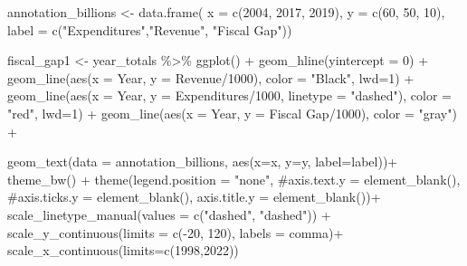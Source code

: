 \documentclass[
  letterpaper,
  DIV=11,
  numbers=noendperiod]{scrreport}
\newenvironment{Shaded}{\begin{snugshade}}{\end{snugshade}}
\newcommand{\AttributeTok}[1]{\textcolor[rgb]{0.40,0.45,0.13}{#1}}
\newcommand{\CommentTok}[1]{\textcolor[rgb]{0.37,0.37,0.37}{#1}}
\newcommand{\DecValTok}[1]{\textcolor[rgb]{0.68,0.00,0.00}{#1}}
\newcommand{\FunctionTok}[1]{\textcolor[rgb]{0.28,0.35,0.67}{#1}}
\newcommand{\NormalTok}[1]{\textcolor[rgb]{0.00,0.23,0.31}{#1}}
\newcommand{\OtherTok}[1]{\textcolor[rgb]{0.00,0.23,0.31}{#1}}
\newcommand{\SpecialCharTok}[1]{\textcolor[rgb]{0.37,0.37,0.37}{#1}}
\newcommand{\StringTok}[1]{\textcolor[rgb]{0.13,0.47,0.30}{#1}}
\begin{document}
\begin{Shaded}
\begin{Highlighting}[]
\NormalTok{annotation\_billions }\OtherTok{\textless{}{-}} \FunctionTok{data.frame}\NormalTok{(}
  \AttributeTok{x =} \FunctionTok{c}\NormalTok{(}\DecValTok{2004}\NormalTok{, }\DecValTok{2017}\NormalTok{, }\DecValTok{2019}\NormalTok{),}
  \AttributeTok{y =} \FunctionTok{c}\NormalTok{(}\DecValTok{60}\NormalTok{, }\DecValTok{50}\NormalTok{, }\DecValTok{10}\NormalTok{),  }
  \AttributeTok{label =} \FunctionTok{c}\NormalTok{(}\StringTok{"Expenditures"}\NormalTok{,}\StringTok{"Revenue"}\NormalTok{, }\StringTok{"Fiscal Gap"}\NormalTok{))}

\NormalTok{fiscal\_gap1 }\OtherTok{\textless{}{-}}\NormalTok{ year\_totals }\SpecialCharTok{\%\textgreater{}\%}
  \FunctionTok{ggplot}\NormalTok{() }\SpecialCharTok{+}
  \FunctionTok{geom\_hline}\NormalTok{(}\AttributeTok{yintercept =} \DecValTok{0}\NormalTok{) }\SpecialCharTok{+}
  \FunctionTok{geom\_line}\NormalTok{(}\FunctionTok{aes}\NormalTok{(}\AttributeTok{x =}\NormalTok{ Year, }\AttributeTok{y =}\NormalTok{ Revenue}\SpecialCharTok{/}\DecValTok{1000}\NormalTok{), }\AttributeTok{color =} \StringTok{"Black"}\NormalTok{, }\AttributeTok{lwd=}\DecValTok{1}\NormalTok{) }\SpecialCharTok{+}
  \FunctionTok{geom\_line}\NormalTok{(}\FunctionTok{aes}\NormalTok{(}\AttributeTok{x =}\NormalTok{ Year, }\AttributeTok{y =}\NormalTok{ Expenditures}\SpecialCharTok{/}\DecValTok{1000}\NormalTok{, }\AttributeTok{linetype =} \StringTok{"dashed"}\NormalTok{), }\AttributeTok{color =} \StringTok{"red"}\NormalTok{, }\AttributeTok{lwd=}\DecValTok{1}\NormalTok{) }\SpecialCharTok{+}
  \FunctionTok{geom\_line}\NormalTok{(}\FunctionTok{aes}\NormalTok{(}\AttributeTok{x =}\NormalTok{ Year, }\AttributeTok{y =} \StringTok{\textasciigrave{}}\AttributeTok{Fiscal Gap}\StringTok{\textasciigrave{}}\SpecialCharTok{/}\DecValTok{1000}\NormalTok{), }\AttributeTok{color =} \StringTok{"gray"}\NormalTok{) }\SpecialCharTok{+}

  \FunctionTok{geom\_text}\NormalTok{(}\AttributeTok{data =}\NormalTok{ annotation\_billions, }\FunctionTok{aes}\NormalTok{(}\AttributeTok{x=}\NormalTok{x, }\AttributeTok{y=}\NormalTok{y, }\AttributeTok{label=}\NormalTok{label))}\SpecialCharTok{+}
    \FunctionTok{theme\_bw}\NormalTok{() }\SpecialCharTok{+}
  \FunctionTok{theme}\NormalTok{(}\AttributeTok{legend.position =} \StringTok{"none"}\NormalTok{, }\CommentTok{\#axis.text.y = element\_blank(),  }
        \CommentTok{\#axis.ticks.y = element\_blank(),}
                                    \AttributeTok{axis.title.y =} \FunctionTok{element\_blank}\NormalTok{())}\SpecialCharTok{+}
    \FunctionTok{scale\_linetype\_manual}\NormalTok{(}\AttributeTok{values =} \FunctionTok{c}\NormalTok{(}\StringTok{"dashed"}\NormalTok{, }\StringTok{"dashed"}\NormalTok{)) }\SpecialCharTok{+}
  \FunctionTok{scale\_y\_continuous}\NormalTok{(}\AttributeTok{limits =} \FunctionTok{c}\NormalTok{(}\SpecialCharTok{{-}}\DecValTok{20}\NormalTok{, }\DecValTok{120}\NormalTok{), }\AttributeTok{labels =}\NormalTok{ comma)}\SpecialCharTok{+}
    \FunctionTok{scale\_x\_continuous}\NormalTok{(}\AttributeTok{limits=}\FunctionTok{c}\NormalTok{(}\DecValTok{1998}\NormalTok{,}\DecValTok{2022}\NormalTok{))}


\end{Highlighting}
\end{Shaded}
\end{document}
